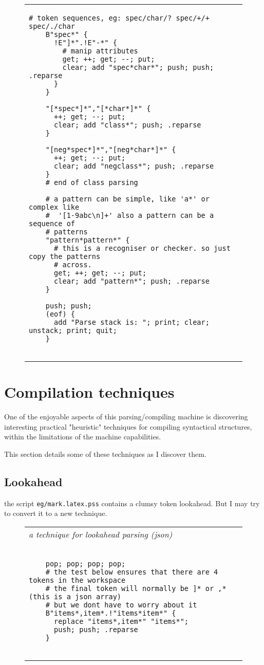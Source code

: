 \documentclass[a4paper,12pt]{article}
\begin{document}
\begin{figure}
\begin{tabular}{ l }
\begin{lstlisting}[breaklines]
    # token sequences, eg: spec/char/? spec/+/+ spec/./char
    B"spec*" {
      !E"]*".!E"-*" {
        # manip attributes
        get; ++; get; --; put;
        clear; add "spec*char*"; push; push; .reparse
      }
    }
    
    "[*spec*]*","[*char*]*" {
      ++; get; --; put;
      clear; add "class*"; push; .reparse
    }

    "[neg*spec*]*","[neg*char*]*" {
      ++; get; --; put;
      clear; add "negclass*"; push; .reparse
    }
    # end of class parsing

    # a pattern can be simple, like 'a*' or complex like 
    #  '[1-9abc\n]+' also a pattern can be a sequence of 
    # patterns
    "pattern*pattern*" {
      # this is a recogniser or checker. so just copy the patterns
      # across.
      get; ++; get; --; put;
      clear; add "pattern*"; push; .reparse
    }
    
    push; push;
    (eof) {
      add "Parse stack is: "; print; clear; unstack; print; quit;
    }
  
 \end{lstlisting} 
 \end{tabular} 

 \end{figure}

\section{Compilation techniques}

  One of the enjoyable aspects of this parsing/compiling machine is
  discovering interesting practical "heuristic" techniques for
  compiling syntactical structures, within the limitations of the
  machine capabilities.

  This section details some of these techniques as I discover them.

\subsection{Lookahead}

  the script \texttt{eg/mark.latex.pss} contains a clumsy token lookahead.
  But I may try to convert it to a new technique.
 \begin{figure}
 \begin{tabular}{ l }
 \emph{ a technique for lookahead parsing (json) } \\ 
 \begin{lstlisting}[breaklines] 

    pop; pop; pop; pop;
    # the test below ensures that there are 4 tokens in the workspace
    # the final token will normally be ]* or ,* (this is a json array)
    # but we dont have to worry about it
    B"items*,item*.!"items*item*" {
      replace "items*,item*" "items*";
      push; push; .reparse
    }
  
 \end{lstlisting} 
 \end{tabular} 

 \end{figure}
  
\end{document}
